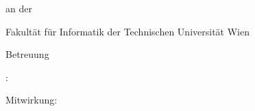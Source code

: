 \begin{center}
   \begin{minipage}[t][6.5cm][b]{\linewidth}
       \centering
       \renewcommand{\baselinestretch}{0.85} 
       \thesistitlefontHUGE\sffamily\bfseries \tuinfthesistitle
   \end{minipage}

   \vspace{1.3cm}{\thesistitlefontLARGE\sffamily \tuinfthesistype}

   \vspace{6mm}{\thesistitlefontlarge\sffamily zur Erlangung des akademischen Grades}

   \vspace{6mm}{\thesistitlefontLARGE\sffamily\bfseries \tuinfthesisdegree}

   \vspace{6mm}{\thesistitlefontlarge\sffamily im Rahmen des Studiums}

   \vspace{6mm}{\thesistitlefontLarge\sffamily\bfseries\tuinfthesiscurriculum}

   \vspace{6.5mm}{\thesistitlefontlarge\sffamily eingereicht von}

   \vspace{6mm}{\thesistitlefontLarge\sffamily\bfseries \tuinfthesisauthor}

   \vspace{1.5mm}{\thesistitlefontlarge\sffamily Matrikelnummer \tuinfthesismatrikelno} 

   \vspace{1.5cm}

   \begin{minipage}[t][1.7cm][t]{\textwidth}
      \vspace{0pt}\raggedright\thesistitlefontnormalsize\sffamily

      an der

      Fakult\"{a}t f\"{u}r Informatik der Technischen Universit\"{a}t Wien
   \end{minipage}
   \begin{minipage}[t][3.5cm][t]{\textwidth}
      \vspace{0pt}\sffamily\thesistitlefontnormalsize\raggedright
  
      Betreuung

      \tuinfthesisbetreuung: \tuinfthesisbetreins

      \raggedright Mitwirkung: \tuinfthesisbetrzwei
   \end{minipage}


\end{center}
